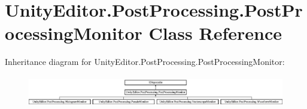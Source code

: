 \hypertarget{class_unity_editor_1_1_post_processing_1_1_post_processing_monitor}{}\section{Unity\+Editor.\+Post\+Processing.\+Post\+Processing\+Monitor Class Reference}
\label{class_unity_editor_1_1_post_processing_1_1_post_processing_monitor}
Inheritance diagram for Unity\+Editor.\+Post\+Processing.\+Post\+Processing\+Monitor\+:\begin{figure}[H]
\begin{center}
\leavevmode
\includegraphics[height=1.372549cm]{class_unity_editor_1_1_post_processing_1_1_post_processing_monitor}
\end{center}
\end{figure}
